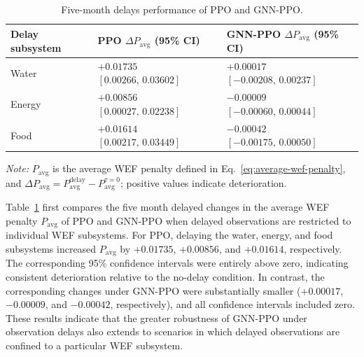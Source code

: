 \documentclass [a4paper,fleqn] {cas-dc}
\begin{document}
\begin{table}[pos=ht]
\centering
\caption{Five-month delays performance of PPO and GNN-PPO.}
\label{tab:sensitivity}
\footnotesize
\setlength{\tabcolsep}{2pt}
\renewcommand{\arraystretch}{1.12}
\begin{tabularx}{\columnwidth}{@{}>{\raggedright\arraybackslash}X
  >{\centering\arraybackslash}m{}
  >{\centering\arraybackslash}m{}@{}}
\toprule
Delay subsystem 
& \shortstack{PPO $\Delta P_{\mathrm{avg}}$\\(95\% CI)}
& \shortstack{GNN-PPO $\Delta P_{\mathrm{avg}}$\\(95\% CI)} \\
\midrule

Water
& \shortstack{$+0.01735$\\$[0.00266,\,0.03602]$}
& \shortstack{$+0.00017$\\$[-0.00208,\,0.00237]$} \\

Energy 
& \shortstack{$+0.00856$\\$[0.00027,\,0.02238]$}
& \shortstack{$-0.00009$\\$[-0.00060,\,0.00044]$} \\

Food 
& \shortstack{$+0.01614$\\$[0.00217,\,0.03449]$}
& \shortstack{$-0.00042$\\$[-0.00175,\,0.00050]$} \\


\bottomrule
\end{tabularx}

\par\vspace{2pt}
\begin{minipage}{\columnwidth}
\raggedright
\textit{Note:} $P_{\mathrm{avg}}$ is the average WEF penalty defined in Eq.~\eqref{eq:average-wef-penalty}, and $\Delta P_{\mathrm{avg}}=P_{\mathrm{avg}}^{\mathrm{delay}}-P_{\mathrm{avg}}^{\tau=0}$; positive values indicate deterioration.
\end{minipage}
\end{table}

Table~\ref{tab:sensitivity} first compares the five month delayed changes in the average WEF penalty $P_{\mathrm{avg}}$ of PPO and GNN-PPO when delayed observations are restricted to individual WEF subsystems. For PPO, delaying the water, energy, and food subsystems increased $P_{\mathrm{avg}}$ by $+0.01735$, $+0.00856$, and $+0.01614$, respectively. The corresponding 95\% confidence intervals were entirely above zero, indicating consistent deterioration relative to the no-delay condition. In contrast, the corresponding changes under GNN-PPO were substantially smaller ($+0.00017$, $-0.00009$, and $-0.00042$, respectively), and all confidence intervals included zero. These results indicate that the greater robustness of GNN-PPO under observation delays also extends to scenarios in which delayed observations are confined to a particular WEF subsystem.
\end{document}
